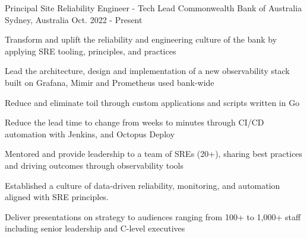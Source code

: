 

\begin{cventries}
  \cventry
    {Principal Site Reliability Engineer - Tech Lead} %
    {Commonwealth Bank of Australia} %
    {Sydney, Australia} %
    {Oct. 2022 - Present} %
    {
      \begin{cvitems} %
      \item {Transform and uplift the reliability and engineering culture of the bank by applying SRE tooling, principles, and practices} 
      \item {Lead the architecture, design and implementation of a new observability stack built on Grafana, Mimir and Prometheus used bank-wide}
      \item {Reduce and eliminate toil through custom applications and scripts written in Go}
      \item {Reduce the lead time to change from weeks to minutes through CI/CD automation with Jenkins, and Octopus Deploy}
      \item {Mentored and provide leadership to a team of SREs (20+), sharing best practices and driving outcomes through observability tools}
      \item {Established a culture of data-driven reliability, monitoring, and automation aligned with SRE principles.}
      \item {Deliver presentations on strategy to audiences ranging from 100+ to 1,000+ staff including senior leadership and C-level executives}
      \end{cvitems}
    }



\end{cventries}
